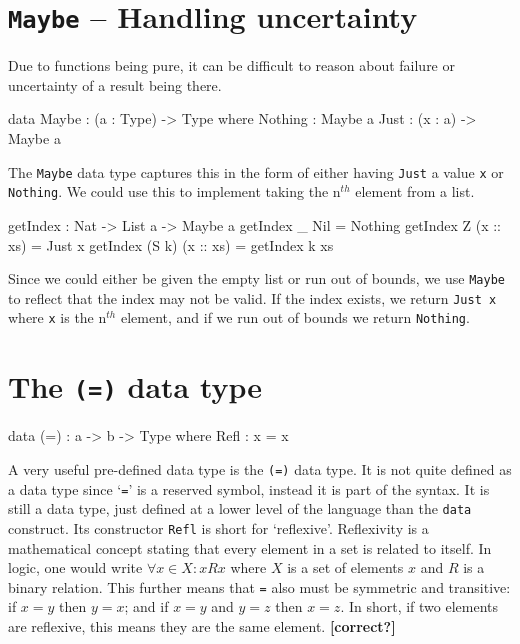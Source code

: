 \section{\texttt{Maybe} -- Handling uncertainty}
    Due to functions being pure, it can be difficult to reason about failure or uncertainty of a result being there.
    \begin{code}[caption={The \texttt{Maybe} data type}]
        data Maybe : (a : Type) -> Type where
            Nothing : Maybe a
            Just : (x : a) -> Maybe a
    \end{code}
    The \texttt{Maybe} data type captures this in the form of either having \texttt{Just} a value \texttt{x} or \texttt{Nothing}. We could use this to implement taking the n$^{th}$ element from a list.
    \begin{code}[caption={List indexing using \texttt{Maybe}}]
        getIndex : Nat -> List a -> Maybe a
        getIndex _ Nil = Nothing
        getIndex Z (x :: xs) = Just x
        getIndex (S k) (x :: xs) = getIndex k xs
    \end{code}
    Since we could either be given the empty list or run out of bounds, we use \texttt{Maybe} to reflect that the index may not be valid. If the index exists, we return \texttt{Just x} where \texttt{x} is the n$^{th}$ element, and if we run out of bounds we return \texttt{Nothing}.

\section{The \texttt{(=)} data type}
    \begin{code}[label={des:refl-concept}, caption={The concept of an equality data type}]
            data (=) : a -> b -> Type where
                Refl : x = x
    \end{code}
        
    A very useful pre-defined data type is the \texttt{(=)} data type. It is not quite defined as a data type since `\texttt{=}' is a reserved symbol, instead it is part of the \Idris syntax. It is still a data type, just defined at a lower level of the language than the \texttt{data} construct. Its constructor \texttt{Refl} is short for `reflexive'. Reflexivity is a mathematical concept stating that every element in a set is related to itself. In logic, one would write $\forall x \in X : x R x$ where $X$ is a set of elements $x$ and $R$ is a binary relation. This further means that \texttt{=} also must be symmetric and transitive: if $x = y$ then $y = x$; and if $x = y$ and $y = z$ then $x = z$. In short, if two elements are reflexive, this means they are the same element. \textbf{[correct?]}
        
